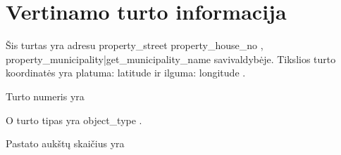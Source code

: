 {%

\section{Vertinamo turto informacija}
Šis turtas yra adresu {{ property_street }} {{ property_house_no }}, {{ property_municipality|get_municipality_name }} savivaldybėje. Tikslios turto koordinatės yra platuma: {{ latitude }} ir ilguma: {{ longitude }}.

{%
Turto numeris yra {%
{%

O turto tipas yra {{ object_type }}.

{%
Pastato aukštų skaičius yra {%
{%


}}}}}}}
